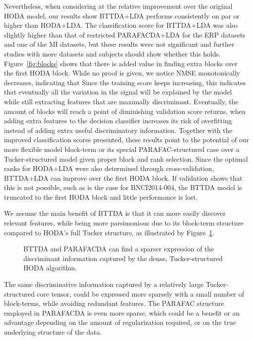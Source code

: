 Nevertheless, when considering at the relative improvement over the original
HODA model, our results show BTTDA+LDA performs consistently on par or higher than HODA+LDA.
The classification score for BTTDA+LDA was also slightly higher than that of
restricted PARAFACDA+LDA for the ERP datasets and one of the MI datasets, but these
results were not significant and further studies with more datasets and
subjects should show whether this holds.
Figure~\ref{fig:blocks} shows that there is added value in finding extra blocks
over the first HODA block.
While no proof is given, we notice NMSE monotonically decreases, indicating that
Since the training score keeps increasing, this indicates that
eventually all the variation in the signal will be explained by the model
while still extracting features that are maximally discriminant.
Eventually, the amount of blocks will reach a point of diminishing validation
score returns, when adding extra features to the decision classifier increases
its risk of overfitting instead of adding extra useful discriminatory
information.
Together with the improved classification scores presented, these results
point to the potential of our more flexible model block-term or
its special PARAFAC-structured case over a Tucker-structured model given proper block and
rank selection.
Since the optimal ranks for HODA+LDA were also determined through
cross-validation, BTTDA+LDA can improve over the first HODA block.
If validation shows that this is not possible, such as is the case for
BNCI2014-004, the BTTDA model is truncated to the first HODA block and little
performance is lost.

We assume the main benefit of BTTDA is that it can more easily discover relevant
features, while
being more parsimonious due to its block-term structure compared to HODA's full
Tucker structure, as illustrated by Figure~\ref{fig:bttda/sparse}.
\begin{figure}
  
  \caption[Sparsity of BTTDA and PARAFACDA]{BTTDA and PARAFACDA can find a
  sparser expression of the discriminant information captured by the dense,
  Tucker-structured HODA algorithm.}
  \label{fig:bttda/sparse}
\end{figure}
The same discriminative information captured by a relatively large
Tucker-structured core tensor, could be expressed more sparsely with a small
number of block-terms, while avoiding redundant features.
The PARAFAC structure employed in PARAFACDA is even more sparse, which could be
a benefit or an advantage depending on the amount of regularization required,
or on the true underlying structure of the data.

